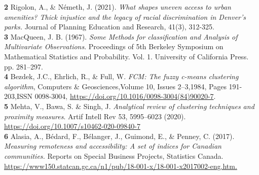 \documentclass[11pt, a4paper]{article}
\begin{document}
\noindent\textbf{2} Rigolon, A., \& Németh, J. (2021). \textit{What shapes uneven access to urban amenities? Thick injustice and the legacy of racial discrimination in Denver’s parks.} Journal of Planning Education and Research, 41(3), 312-325. \\ 

\noindent\textbf{3} MacQueen, J. B. (1967). \textit{Some Methods for classification and Analysis of Multivariate Observations}. Proceedings of 5th Berkeley Symposium on Mathematical Statistics and Probability. Vol. 1. University of California Press. pp. 281–297. \\ 

\noindent\textbf{4} Bezdek, J.C., Ehrlich, R., \& Full, W. \textit{FCM: The fuzzy c-means clustering algorithm}, Computers \& Geosciences,Volume 10, Issues 2–3,1984, Pages 191-203,ISSN 0098-3004, \sloppy\url{https://doi.org/10.1016/0098-3004(84)90020-7}. \\ %

\noindent\textbf{5} Mehta, V., Bawa, S. \& Singh, J. \textit{Analytical review of clustering techniques and proximity measures}. Artif Intell Rev 53, 5995–6023 (2020). \sloppy\url{https://doi.org/10.1007/s10462-020-09840-7} \\


\noindent\textbf{6} Alasia, A., Bédard, F., Bélanger, J., Guimond, E., \& Penney, C. (2017). \textit{Measuring remoteness and accessibility: A set of indices for Canadian communities.} Reports on Special Business Projects, Statistics Canada. \sloppy\url{https://www150.statcan.gc.ca/n1/pub/18-001-x/18-001-x2017002-eng.htm.} \\
\end{document}
